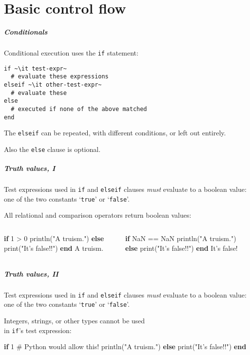 \documentclass[english,serif,mathserif,xcolor=pdftex,dvipsnames,table]{beamer}
\begin{document}
\part{Basic control flow}
\begin{frame}[fragile]
  \frametitle{Conditionals}
  Conditional execution uses the \texttt{if} statement:
\begin{lstlisting}
if ~\it test-expr~
  # evaluate these expressions
elseif ~\it other-test-expr~
  # evaluate these
else
  # executed if none of the above matched
end
\end{lstlisting}

  \+The \texttt{elseif} can be repeated, with different conditions, or
  left out entirely.

  \+
  Also the \texttt{else} clause is optional.
\end{frame}


\begin{frame}[fragile]
  \frametitle{Truth values, I}
  \small

  Test expressions used in \texttt{if} and \texttt{elseif} clauses
  \emph{must} evaluate to a boolean value: one of the two constants
  `\texttt{true}' or `\texttt{false}'.

  \+
  All relational and comparison operators return boolean values:
  \begin{columns}
    \begin{column}{0.5\textwidth}
\begin{semiverbatim}
\julia \textbf{if} 1 > 0
    println("A truism.")
  \textbf{else}
    print("It's false!!")
  \textbf{end}
A truism.
\end{semiverbatim}
    \end{column}
    \begin{column}{0.5\textwidth}
\begin{semiverbatim}
\julia \textbf{if} NaN == NaN
    println("A truism.")
  \textbf{else}
    print("It's false!!")
  \textbf{end}
It's false!
\end{semiverbatim}
    \end{column}
  \end{columns}
\end{frame}


\begin{frame}[fragile]
  \frametitle{Truth values, II}
  \small

  Test expressions used in \texttt{if} and \texttt{elseif} clauses
  \emph{must} evaluate to a boolean value: one of the two constants
  `\texttt{true}' or `\texttt{false}'.

  \+ Integers, strings, or other types cannot be used \\ in \texttt{if}'s
  test expression:
\begin{semiverbatim}
\julia \textbf{if} 1  # Python would allow this!
    println("A truism.")
  \textbf{else}
    print("It's false!!")
  \textbf{end}
\end{semiverbatim}
\end{frame}
\end{document}
